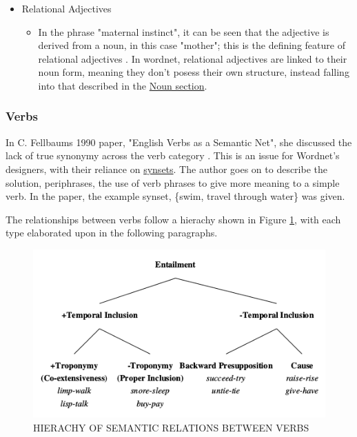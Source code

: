 \documentclass[]{article}
\begin{document}
\begin{itemize}
	\item Relational Adjectives
	\begin{itemize}
		\item In the phrase "maternal instinct", it can be seen that the adjective is derived from a noun, in this case "mother"; this is the defining feature of relational adjectives \cite{WN3Adjectives}. In wordnet, relational adjectives are linked to their noun form, meaning they don't posess their own structure, instead falling into that described in the \hyperref[Nouns]{Noun section}.
	\end{itemize}		
		
	
\end{itemize}


\subsubsection{Verbs}
\label{Verbs}
In C. Fellbaums 1990 paper, "English Verbs as a Semantic Net", she discussed the lack of true synonymy across the verb category \cite{WN4Verbs}. This is an issue for Wordnet's designers, with their reliance on \hyperref[Synsets]{synsets}. The author goes on to describe the solution, periphrases, the use of verb phrases to give more meaning to a simple verb. In the paper, the example synset, \{swim, travel through water\} was given. 

The relationships between verbs follow a hierachy shown in Figure \ref{fig:WN4Verbs_pp15}, with each type elaborated upon in the following paragraphs.

\begin{figure}[h]
	\includegraphics[scale=0.7]{WN4Verbs_pp15.png}
	\caption{HIERACHY OF SEMANTIC RELATIONS BETWEEN VERBS \cite[p.~15]{WN4Verbs}}
	\label{fig:WN4Verbs_pp15}
\end{figure}
\end{document}
